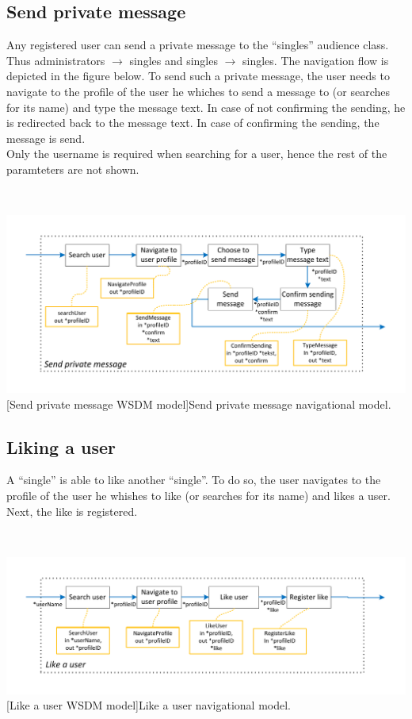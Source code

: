 \documentclass[11pt, a4paper,svglistings,oneside]{book}
\begin{document}
\subsection{Send private message}

Any registered user can send a private message to the ``singles'' audience class. Thus administrators $\rightarrow$ singles and singles $\rightarrow$ singles. The navigation flow is depicted in the figure below. To send such a private message, the user needs to navigate to the profile of the user he whiches to send a message to (or searches for its name) and type the message text. In case of not confirming the sending, he is redirected back to the message text. In case of confirming the sending, the message is send. \\
Only the username is required when searching for a user, hence the rest of the paramteters are not shown.

$\;$ \\
\noindent\begin{minipage}{\textwidth}
    \centering
   \includegraphics[scale=0.9]{nav_SendPrivateMessage.pdf}
 [Send private message WSDM model]{Send private message navigational model.}
\end{minipage}

\subsection{Liking a user}

A ``single'' is able to like another ``single''. To do so, the user navigates to the profile of the user he whishes to like (or searches for its name) and likes a user. Next, the like is registered.

$\;$ \\
\noindent\begin{minipage}{\textwidth}
    \centering
   \includegraphics[scale=1]{nav_LikeUser.pdf}
 [Like a user WSDM model]{Like a user navigational model.}
\end{minipage}
\end{document}
